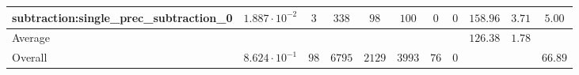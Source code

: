 \begin{tabular}{|l|c|c|c|c|c|c|c|c|c|c|}
subtraction:single\_prec\_subtraction\_0         & $ 1.887 \cdot 10^{-2} $ & $ 3      $ & $ 338  $ & $ 98   $ & $ 100   $ & $ 0  $ & $ 0 $ & $ 158.96      $ & $ 3.71    $ & $ 5.00    $ \\
\hline
Average                                          & $                     $ & $        $ & $      $ & $      $ & $       $ & $    $ & $   $ & $ 126.38      $ & $ 1.78    $ & $         $ \\
\hline
Overall                                          & $ 8.624 \cdot 10^{-1} $ & $ 98     $ & $ 6795 $ & $ 2129 $ & $ 3993  $ & $ 76 $ & $ 0 $ & $             $ & $         $ & $ 66.89   $ \\
\hline
\end{tabular}
